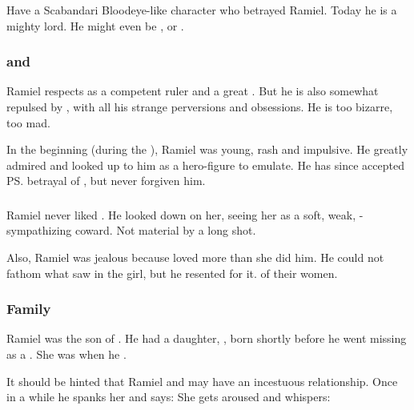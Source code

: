 Have a Scabandari Bloodeye-like character who betrayed Ramiel. Today he is a mighty \resphan{} lord. 
He might even be \Teshrial, or \Azraid. 





\subsubsection{\Azraid{} and \Damiarch}
Ramiel respects \Azraid{} as a competent ruler and a great \resphan. But he is also somewhat repulsed by \Azraid, with all his strange perversions and obsessions. He is too bizarre, too mad.

In the beginning (during the ), Ramiel was young, rash and impulsive. 
He greatly admired \Damiarch{} and looked up to him as a hero-figure to emulate. 
He has since accepted \ps{\Azraid}{} betrayal of \Damiarch, but never forgiven him. 




\subsubsection{\Eryal}
Ramiel never liked \Eryal. 
He looked down on her, seeing her as a soft, weak, \Merkyrah-sympathizing coward. 
Not \Mystraacht{} material by a long shot. 

Also, Ramiel was jealous because \Shiaraid{} loved \Eryal{} more than she did him. 
He could not fathom what \Shiaraid{} saw in the girl, but he resented \Eryal{} for it. 
 of their women. 





\subsubsection{Family}
Ramiel was the son of . 
He had a daughter, , born shortly before he went missing as a \malach. 
She was  when he . 

It should be hinted that Ramiel and \Cishiel may have an incestuous relationship. 
Once in a while he spanks her and says: 
She gets aroused and whispers: 





